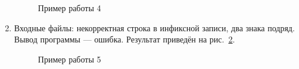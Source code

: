 \documentclass[12pt, a4paper]{article}
\begin{document}
\begin{enumerate}
\begin{figure}[h]
  		\caption{Пример работы 4}
  		\label{img:grap4}
	\end{figure}
	\newpage
	\item Входные файлы: некорректная строка в инфиксной записи, два 
	знака подряд.\\
	Вывод программы --- ошибка. Результат приведён на 
	рис.~\ref{img:grap5}.
	\begin{figure}[h]
  		\caption{Пример работы 5}
  		\label{img:grap5}
	\end{figure}

\end{enumerate}
\end{document}
